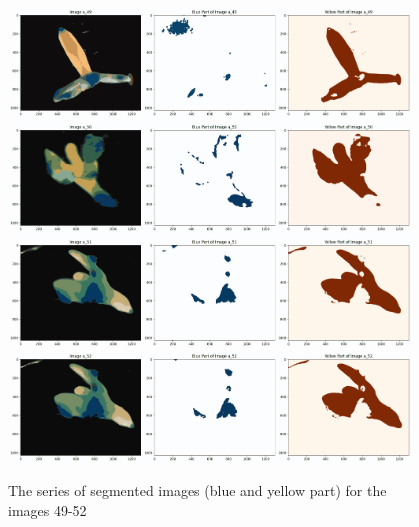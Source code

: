 \documentclass{article}
\begin{document}
\begin{figure}[h!]
\centering
\includegraphics[width=0.95\textwidth]{Report/Images/Appendix Images/ColorSegments/Image49.png}
\includegraphics[width=0.95\textwidth]{Report/Images/Appendix Images/ColorSegments/Image50.png}
\includegraphics[width=0.95\textwidth]{Report/Images/Appendix Images/ColorSegments/Image51.png}
\includegraphics[width=0.95\textwidth]{Report/Images/Appendix Images/ColorSegments/Image52.png}
\caption{The series of segmented images (blue and yellow part) for the images 49-52} 
\label{fig:segment49-52}
\end{figure}
\end{document}
